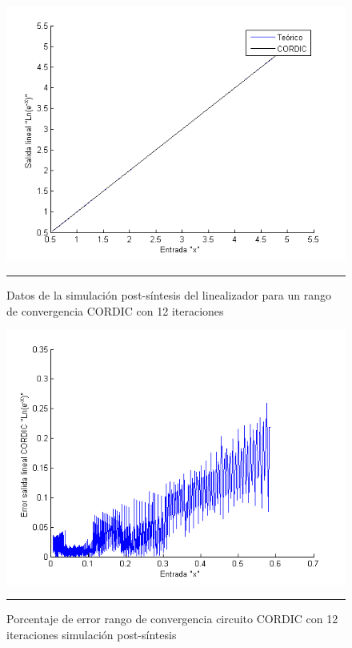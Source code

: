 \begin{figure}[H]
  \centering
    \includegraphics[scale=0.7]{./RANGO_12iter.png}
    \rule{35em}{0.5pt}
  \caption[Datos de la simulacion post-síntesis del linealizador para un rango de convergencia CORDIC con 12 iteraciones]{Datos de la simulación post-síntesis del linealizador para un rango de convergencia CORDIC con 12 iteraciones}
  \label{fig:RG12}
\end{figure}

\begin{figure}[H]
  \centering
    \includegraphics[scale=0.7]{./RANGO_12iter_ERROR.png}
    \rule{35em}{0.5pt}
  \caption[Porcentaje de error rango de convergencia circuito CORDIC con 12 iteraciones simulación post-síntesis]{Porcentaje de error rango de convergencia circuito CORDIC con 12 iteraciones simulación post-síntesis}
  \label{fig:RGE12}
\end{figure}

